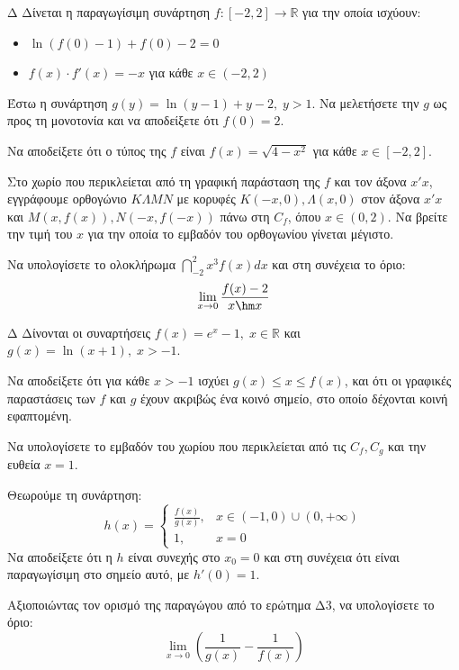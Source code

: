 \begin{thema}{Δ}
Δίνεται η παραγωγίσιμη συνάρτηση $f:[-2,2]\to\mathbb{R}$ για την οποία ισχύουν:
\begin{itemize}
    \item $\ln{\left(f(0)-1\right)}+f(0)-2=0$
    \item $f(x)\cdot f'(x)=-x$ για κάθε $x\in(-2,2)$
\end{itemize}
\begin{erwthma}
    \item Έστω η συνάρτηση $g(y) = \ln(y-1) + y - 2, \; y > 1$. Να μελετήσετε την $g$ ως προς τη μονοτονία και να αποδείξετε ότι $f(0)=2$.
    \item Να αποδείξετε ότι ο τύπος της $f$ είναι $\displaystyle f(x)=\sqrt{4-x^2}$ για κάθε $x\in[-2,2]$.
    \item Στο χωρίο που περικλείεται από τη γραφική παράσταση της $f$ και τον άξονα $x'x$, εγγράφουμε ορθογώνιο $K\Lambda MN$ με κορυφές $K(-x, 0), \Lambda(x, 0)$ στον άξονα $x'x$ και $M(x, f(x)), N(-x, f(-x))$ πάνω στη $C_f$, όπου $x \in (0, 2)$. Να βρείτε την τιμή του $x$ για την οποία το εμβαδόν του ορθογωνίου γίνεται μέγιστο.
    \item Να υπολογίσετε το ολοκλήρωμα $\displaystyle \dint_{-2}^2 x^3 f(x) dx$ και στη συνέχεια το όριο:
    \[ \lim_{x \to 0} \frac{f(x) - 2}{x \hm x} \]
\end{erwthma}
\end{thema}

\begin{thema}{Δ}
Δίνονται οι συναρτήσεις $\displaystyle f(x) = e^x - 1, \; x \in \mathbb{R}$ και $\displaystyle g(x) = \ln(x+1), \; x > -1$.
\begin{erwthma}
    \item Να αποδείξετε ότι για κάθε $x > -1$ ισχύει $g(x) \le x \le f(x)$, και ότι οι γραφικές παραστάσεις των $f$ και $g$ έχουν ακριβώς ένα κοινό σημείο, στο οποίο δέχονται κοινή εφαπτομένη.
    \item Να υπολογίσετε το εμβαδόν του χωρίου που περικλείεται από τις $C_f, C_g$ και την ευθεία $x = 1$.
    \item Θεωρούμε τη συνάρτηση:
    \[ h(x) = \begin{cases} 
        \displaystyle \frac{f(x)}{g(x)}, & x \in (-1, 0) \cup (0, +\infty) \\[2ex]
        1, & x = 0 
    \end{cases} \]
    Να αποδείξετε ότι η $h$ είναι συνεχής στο $x_0 = 0$ και στη συνέχεια ότι είναι παραγωγίσιμη στο σημείο αυτό, με $h'(0) = 1$.
    \item Αξιοποιώντας τον ορισμό της παραγώγου από το ερώτημα Δ3, να υπολογίσετε το όριο:
    \[ \lim_{x \to 0} \left( \frac{1}{g(x)} - \frac{1}{f(x)} \right) \]
\end{erwthma}
\end{thema}

